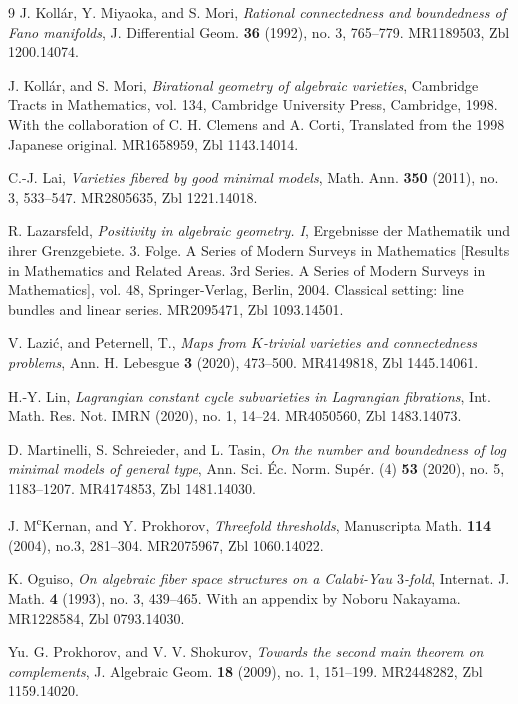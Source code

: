 \documentclass[11pt]{ip-journal}
\theoremstyle{definition}
\begin{document}
\begin{thebibliography}{9}
J. Koll\'{a}r, 
Y. Miyaoka, 
and 
S. Mori,
\emph{Rational connectedness and boundedness of {F}ano manifolds},
J. Differential Geom.
\textbf{36}
(1992),
no. 3,
765--779.
MR1189503, 
Zbl 1200.14074.

J. Koll\'{a}r, 
and 
S. Mori,
\emph{Birational geometry of algebraic varieties}, 
Cambridge Tracts in Mathematics, 
vol. 134, 
Cambridge University Press, 
Cambridge, 
1998.
With the collaboration of C. H. Clemens and A. Corti, Translated from the 1998 Japanese original.
MR1658959, 
Zbl 1143.14014.

C.-J. Lai, 
\emph{Varieties fibered by good minimal models},
Math. Ann.
\textbf{350}
(2011),
no. 3,
533--547.
MR2805635,
Zbl 1221.14018.

R. Lazarsfeld, 
\emph{Positivity in algebraic geometry. {I}},
Ergebnisse der Mathematik und ihrer Grenzgebiete. 
3. Folge. 
A Series of Modern Surveys in Mathematics 
[Results in Mathematics and Related Areas. 
3rd Series. 
A Series of Modern Surveys in Mathematics],
vol. 48,
Springer-Verlag, Berlin,
2004.
Classical setting: line bundles and linear series.
MR2095471,
Zbl 1093.14501.

V. Lazi\'{c}, 
and 
Peternell, T.,
\emph{Maps from {$K$}-trivial varieties and connectedness problems},
Ann. H. Lebesgue
\textbf{3}
(2020),
473--500.
MR4149818,
Zbl 1445.14061.

H.-Y. Lin,
\emph{Lagrangian constant cycle subvarieties in {L}agrangian fibrations},
{Int. Math. Res. Not. IMRN}
(2020),
no. 1,
14--24.
MR4050560,
Zbl 1483.14073.

D. Martinelli, 
S. Schreieder, 
and 
L. Tasin, 
\emph{On the number and boundedness of log minimal models of general type},
{Ann. Sci. \'{E}c. Norm. Sup\'{e}r. (4)}
\textbf{53}
(2020),
no. 5,
1183--1207.
MR4174853,
Zbl 1481.14030.

J. M\textsuperscript{c}Kernan, 
and 
Y. Prokhorov, 
\emph{Threefold thresholds},
Manuscripta Math.
\textbf{114}
(2004),
no.3,
281--304.
MR2075967,
Zbl 1060.14022.

K. Oguiso, 
\emph{On algebraic fiber space structures on a {C}alabi-{Y}au {$3$}-fold},
Internat. J. Math.
\textbf{4}
(1993),
no. 3,
439--465.
With an appendix by Noboru Nakayama.
MR1228584,
Zbl 0793.14030.

Yu. G. Prokhorov, 
and 
V. V. Shokurov, 
\emph{Towards the second main theorem on complements},
{J. Algebraic Geom.}
\textbf{18}
(2009),
no. 1,
151--199.
MR2448282,
Zbl 1159.14020.


\end{thebibliography}
\end{document}
